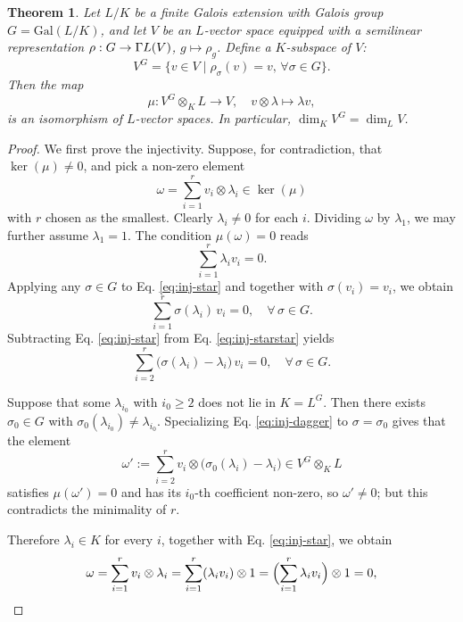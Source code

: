\documentclass[10pt,a4paper]{amsart}
\newtheorem{theorem}{Theorem}
\begin{document}
\begin{theorem}\label{thm:galois-descent}
	Let $L/K$ be a finite Galois extension with Galois group $G = \mathrm{Gal}(L/K)$, and let
	$V$ be an $L$-vector space equipped with a semilinear representation $\rho : G\to \Gamma\rm{L}(V)$, $g\mapsto \rho_{g} $. Define a $K$-subspace of $V$:  $$V^G = \{v \in V \mid \rho_{\sigma}(v) = v, \, \forall \sigma \in G\}.$$ Then the
	map
	\[
	\mu \colon V^{G}\otimes_{K}L \longrightarrow V,
	\quad
	v\otimes \lambda \longmapsto \lambda v,
	\]
	is an isomorphism of $L$-vector spaces. In particular,
	$\dim_{K}V^{G}=\dim_{L}V$.
\end{theorem}

\begin{proof}
We first prove the injectivity. Suppose, for contradiction, that $\ker(\mu)\neq 0$, and pick a non-zero element
	\[
	\omega=\sum_{i=1}^{r}v_{i}\otimes \lambda_{i}\in\ker(\mu)
	\]
	with $r$ chosen as the smallest. Clearly $\lambda_{i}\neq 0$ for each $i$. Dividing $\omega$ by $\lambda_{1}$,
	we may further assume $\lambda_{1}=1$. The condition $\mu(\omega)=0$
	reads
	\begin{equation}\label{eq:inj-star}
		\sum_{i=1}^{r}\lambda_{i}v_{i}=0.
	\end{equation}
	Applying any $\sigma\in G$ to Eq. \eqref{eq:inj-star} and together with $\sigma(v_{i})=v_{i}$, we obtain
	\begin{equation}\label{eq:inj-starstar}
		\sum_{i=1}^{r}\sigma(\lambda_{i})\,v_{i}=0, \quad \forall\,\sigma\in G.
	\end{equation}
	Subtracting Eq. \eqref{eq:inj-star} from Eq. \eqref{eq:inj-starstar} yields
	\begin{equation}\label{eq:inj-dagger}
		\sum_{i=2}^{r}\bigl(\sigma(\lambda_{i})-\lambda_{i}\bigr)\,v_{i}=0,
		\quad \forall\,\sigma\in G.
	\end{equation}
	
	Suppose that some $\lambda_{i_{0}}$ with
	$i_{0}\geq 2$ does not lie in $K=L^{G}$. Then there exists
	$\sigma_{0}\in G$ with
	$\sigma_{0}(\lambda_{i_{0}})\neq \lambda_{i_{0}}$. Specializing Eq.
	\eqref{eq:inj-dagger} to $\sigma=\sigma_{0}$ gives that the element
	\[
	\omega':=\sum_{i=2}^{r}v_{i}\otimes
	\bigl(\sigma_{0}(\lambda_{i})-\lambda_{i}\bigr) \in V^{G}\otimes_{K}L
	\]
	satisfies $\mu(\omega')=0$ and has its $i_{0}$-th coefficient non-zero,
	so $\omega'\neq 0$; but this contradicts the
	minimality of $r$.
	
	Therefore $\lambda_{i}\in K$ for every $i$, together with Eq. \eqref{eq:inj-star}, we obtain
	\[
	\omega=\sum_{i=1}^{r}v_{i}\otimes \lambda_{i}
	=\sum_{i=1}^{r}(\lambda_{i}v_{i})\otimes 1
	=\Bigl(\sum_{i=1}^{r}\lambda_{i}v_{i}\Bigr)\otimes 1=0,
	\]



\end{proof}
\end{document}
